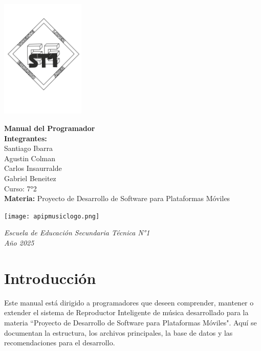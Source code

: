 \documentclass[a4paper,12pt]{article}
\begin{document}
\begin{flushright}
    \includegraphics[width=4cm]{LOGO-EEST1.png}
\end{flushright}

\vspace*{2cm}

\begin{center}
    {\LARGE\bfseries Manual del Programador} \\[1.5cm]
    \textbf{Integrantes:} \\[0.3cm]
    Santiago Ibarra \\[0.2cm]
    Agustin Colman \\[0.2cm]
    Carlos Insaurralde \\[0.2cm]
    Gabriel Beneitez \\[1.2cm]
    Curso: 7°2 \\
    \vspace{0.5cm}
    \textbf{Materia:} Proyecto de Desarrollo de Software para Plataformas Móviles
    
    \vspace{0.7cm}
    \texttt{[image: apipmusiclogo.png]}\\[0.5cm]
\end{center}

\vfill

\begin{center}
    \textit{Escuela de Educación Secundaria Técnica N°1} \\
    \textit{Año 2025}
\end{center}

\thispagestyle{empty}
\newpage

\tableofcontents
\newpage

\section{Introducción}
Este manual está dirigido a programadores que deseen comprender, mantener o extender el sistema de Reproductor Inteligente de música desarrollado para la materia ``Proyecto de Desarrollo de Software para Plataformas Móviles". Aquí se documentan la estructura, los archivos principales, la base de datos y las recomendaciones para el desarrollo.
\end{document}
